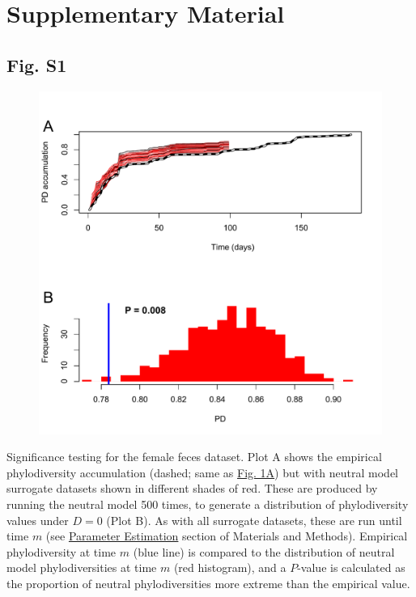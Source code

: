 \documentclass{article}
\begin{document}
\section{Supplementary Material}
{\parindent0pt %
\subsection{Fig. S1}\label{sec:figureS1}
\begin{figure}[ht]
	\centering
	\includegraphics[scale=0.80]{figs/Fig_S1.pdf}
\end{figure}
Significance testing for the female feces dataset. Plot A shows the empirical phylodiversity accumulation (dashed; same as \hyperref[sec:figure1]{Fig. 1A}) but with neutral model surrogate datasets shown in different shades of red. These are produced by running the neutral model 500 times, to generate a distribution of phylodiversity values under \(D = 0\) (Plot B). As with all surrogate datasets, these are run until time \(m\) (see \hyperref[sec:parameterEstimation]{Parameter Estimation} section of Materials and Methods). Empirical phylodiversity at time \(m\) (blue line) is compared to the distribution of neutral model phylodiversities at time \(m\) (red histogram), and a \(P\)-value is calculated as the proportion of neutral phylodiversities more extreme than the empirical value. 
\newpage

}
\end{document}
